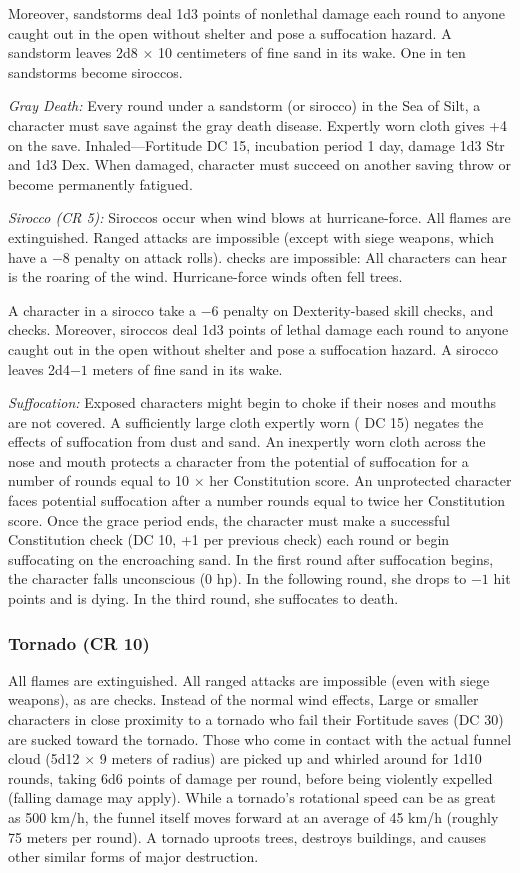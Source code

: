 Moreover, sandstorms deal 1d3 points of nonlethal damage each round to anyone caught out in the open without shelter and pose a suffocation hazard. A sandstorm leaves 2d8 $\times$ 10 centimeters of fine sand in its wake. One in ten sandstorms become siroccos.

\textit{Gray Death:} Every round under a sandstorm (or sirocco) in the Sea of Silt, a character must save against the gray death disease. Expertly worn cloth gives +4 on the save. Inhaled---Fortitude DC 15, incubation period 1 day, damage 1d3 Str and 1d3 Dex. When damaged, character must succeed on another saving throw or become permanently fatigued.

\textit{Sirocco (CR 5):} Siroccos occur when wind blows at hurricane-force. All flames are extinguished. Ranged attacks are impossible (except with siege weapons, which have a $-8$ penalty on attack rolls).  checks are impossible: All characters can hear is the roaring of the wind. Hurricane-force winds often fell trees.

A character in a sirocco take a $-6$ penalty on Dexterity-based skill checks, and  checks. Moreover, siroccos deal 1d3 points of lethal damage each round to anyone caught out in the open without shelter and pose a suffocation hazard. A sirocco leaves 2d4$-1$ meters of fine sand in its wake.

\textit{Suffocation:} Exposed characters might begin to choke if their noses and mouths are not covered. A sufficiently large cloth expertly worn ( DC 15) negates the effects of suffocation from dust and sand. An inexpertly worn cloth across the nose and mouth protects a character from the potential of suffocation for a number of rounds equal to 10 $\times$ her Constitution score. An unprotected character faces potential suffocation after a number rounds equal to twice her Constitution score. Once the grace period ends, the character must make a successful Constitution check (DC 10, +1 per previous check) each round or begin suffocating on the encroaching sand. In the first round after suffocation begins, the character falls unconscious (0 hp). In the following round, she drops to $-1$ hit points and is dying. In the third round, she suffocates to death.

\subsubsection{Tornado (CR 10)}
All flames are extinguished. All ranged attacks are impossible (even with siege weapons), as are  checks. Instead of the normal wind effects, Large or smaller characters in close proximity to a tornado who fail their Fortitude saves (DC 30) are sucked toward the tornado. Those who come in contact with the actual funnel cloud (5d12 $\times$ 9 meters of radius) are picked up and whirled around for 1d10 rounds, taking 6d6 points of damage per round, before being violently expelled (falling damage may apply). While a tornado's rotational speed can be as great as 500 km/h, the funnel itself moves forward at an average of 45 km/h (roughly 75 meters per round). A tornado uproots trees, destroys buildings, and causes other similar forms of major destruction.

